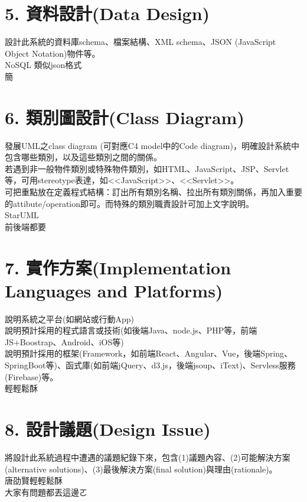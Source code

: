 \documentclass{report}
\begin{document}
\section*{5. 資料設計(Data Design)}

\begin{obeylines}
\parindent=0pt
設計此系統的資料庫schema、檔案結構、XML schema、JSON (JavaScript Object Notation)物件等。
NoSQL 類似json格式
簡
\end{obeylines}

\section*{6. 類別圖設計(Class Diagram)}

\begin{obeylines}
\parindent=0pt
發展UML之class diagram (可對應C4 model中的Code diagram)，明確設計系統中包含哪些類別，以及這些類別之間的關係。
若遇到非一般物件類別或特殊物件類別，如HTML、JavaScript、JSP、Servlet等，可用stereotype表達，如<<JavaScript>>、<<Servlet>>。
可把重點放在定義程式結構：訂出所有類別名稱、拉出所有類別關係，再加入重要的attibute/operation即可。而特殊的類別職責設計可加上文字說明。
	StarUML
	前後端都要
\end{obeylines}

\section*{7. 實作方案(Implementation Languages and Platforms)}

\begin{obeylines}
\parindent=0pt
說明系統之平台(如網站或行動App)
說明預計採用的程式語言或技術(如後端Java、node.js、PHP等，前端JS+Boostrap、Android、iOS等)
說明預計採用的框架(Framework，如前端React、Angular、Vue，後端Spring、SpringBoot等)、函式庫(如前端jQuery、d3.js，後端jsoup、iText)、Servless服務(Firebase)等。
輕輕鬆酥
\end{obeylines}

\section*{8. 設計議題(Design Issue)}

\begin{obeylines}
\parindent=0pt
將設計此系統過程中遭遇的議題紀錄下來，包含(1)議題內容、(2)可能解決方案(alternative solutions)、(3)最後解決方案(final solution)與理由(rationale)。
唐劭賢輕輕鬆酥
大家有問題都丟這邊ㄛ
\end{obeylines}
\end{document}

